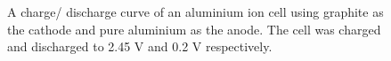 \begin{itemize}
\begin{figure}[tbh!]
\caption{A charge/ discharge curve of an aluminium ion cell using graphite as the cathode and pure aluminium as the anode. The cell was charged and discharged to 2.45 V and 0.2 V respectively.}
\label{Figures/chap1fig:CDCforcellvoltage}
\end{figure}
    

\end{itemize}
